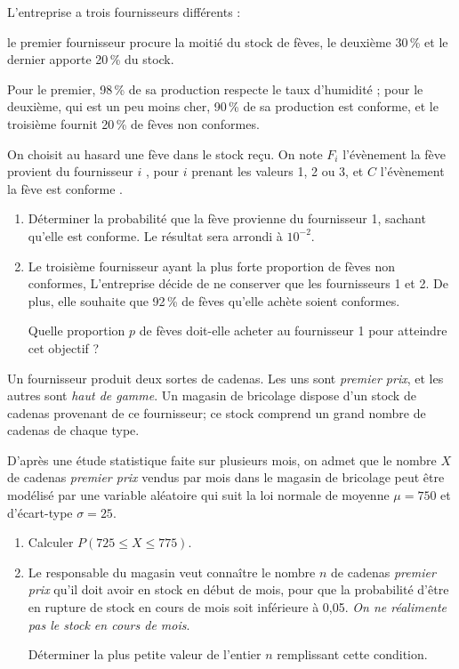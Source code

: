\documentclass[12pt,french]{article}
\begin{document}
\begin{question}[subtitle={Amérique du Nord 2015}]
L'entreprise a trois fournisseurs différents : 

le premier fournisseur procure la moitié du stock de fèves, le deuxième
30\,\% et le dernier apporte 20\,\% du stock. 

Pour le premier, 98\,\% de sa production respecte le taux d'humidité ; pour
le deuxième, qui est un peu moins cher, 90\,\% de sa production est
conforme, et le troisième fournit 20\,\% de fèves non conformes. 

On choisit au hasard une fève dans le stock reçu. On note $F_i$ l'évènement
\og la fève provient du fournisseur $i$ \fg, pour $i$ prenant les valeurs 1,
2 ou 3, et $C$ l'évènement \og la fève est conforme \fg. 

\medskip

\begin{enumerate}
  \item Déterminer la probabilité que la fève provienne du fournisseur 1,
    sachant qu'elle est conforme. Le résultat sera arrondi à $10^{-2}$. 
  \item Le troisième fournisseur ayant la plus forte proportion de fèves non
    conformes, L’entreprise décide de ne conserver que les fournisseurs 1 et
    2. De plus, elle souhaite que 92\,\% de fèves qu'elle achète soient
    conformes. 

    Quelle proportion $p$ de fèves doit-elle acheter au fournisseur 1 pour
    atteindre cet objectif ?
\end{enumerate}

\end{question}

\begin{question}[subtitle={Centres étrangers 2015}]
Un fournisseur produit deux sortes de cadenas. Les uns sont \emph{premier
prix}, et les autres sont \emph{haut de gamme}. Un magasin de bricolage
dispose d'un stock de cadenas provenant de ce fournisseur; ce
stock comprend un grand nombre de cadenas de chaque type.

D'après une étude statistique faite sur plusieurs mois, on admet que le
nombre $X$ de cadenas
\emph{premier prix} vendus par mois dans le magasin de bricolage peut être
modélisé par une variable aléatoire qui suit la loi normale de moyenne $\mu
= 750$ et d'écart-type $\sigma = 25$.

\medskip

\begin{enumerate}
  \item Calculer $P(725 \leqslant  X \leqslant 775)$.
  \item Le responsable du magasin veut connaître le nombre $n$ de cadenas
    \emph{premier prix} qu'il doit avoir en stock en début de mois, pour que
    la probabilité d'être en rupture de stock en cours de mois soit
    inférieure à 0,05. \emph{On ne réalimente pas le stock en cours de
    mois}.

    \medskip

    Déterminer la plus petite valeur de l'entier $n$ remplissant cette
    condition.
\end{enumerate}

\end{question}
\end{document}

